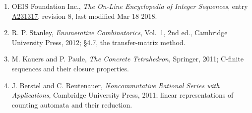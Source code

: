 \documentclass[11pt]{article}
\theoremstyle{definition}
\begin{document}
\begin{enumerate}

\item OEIS Foundation Inc., \emph{The On-Line Encyclopedia of Integer Sequences}, entry \href{https://oeis.org/A231317}{A231317}, revision 8, last modified Mar 18 2018.

\item R. P. Stanley, \emph{Enumerative Combinatorics}, Vol.~1, 2nd ed., Cambridge University Press, 2012; \S4.7, the transfer-matrix method.

\item M. Kauers and P. Paule, \emph{The Concrete Tetrahedron}, Springer, 2011; C-finite sequences and their closure properties.

\item J. Berstel and C. Reutenauer, \emph{Noncommutative Rational Series with Applications}, Cambridge University Press, 2011; linear representations of counting automata and their reduction.

\end{enumerate}
\end{document}
